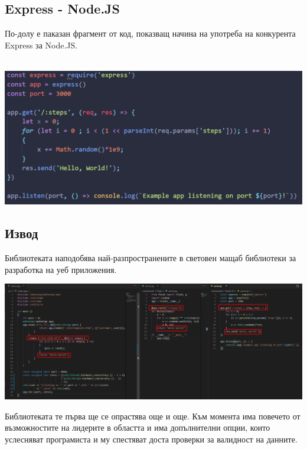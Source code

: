 \documentclass[documentation.tex]{subfiles}
\begin{document}
\subsection{Express - Node.JS}
    \begin{text}\par
    По-долу е паказан фрагмент от код, показващ начина на употреба на конкурента Express за Node.JS.
    \end{text}\\
    {\centering
    \includegraphics[width=1\textwidth]{images/nodejs.png}
    }
\subsection{Извод}
    \begin{text}\par
        Библиотеката наподобява най-разпространените в световен мащаб библиотеки за разработка на уеб приложения.
    \end{text}
    
    {\centering
    \includegraphics[width=1.2\textwidth]{images/all_new.png}
    }
    
    \begin{text}\par
        Библиотеката те първа ще се опрастява още и още. Към момента има повечето от възможностите на лидерите в областта и има допълнителни опции, които услесняват програмиста и му спестяват доста проверки за валидност на данните.
    \end{text}
\end{document}

